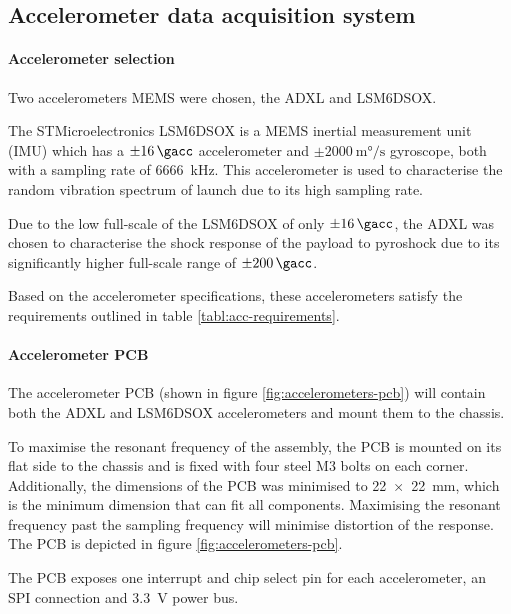 \documentclass[draft]{report}
\begin{document}
\subsection{Accelerometer data acquisition system}
\paragraph{Accelerometer selection}

Two accelerometers MEMS were chosen, the ADXL and LSM6\-DSOX.

The STMicroelectronics LSM6\-DSOX is a MEMS inertial measurement unit (IMU) which has a $\pm\SI{16}{\gacc}$ accelerometer and $\pm\SI{2000}{\milli\degree\per\second}$ gyroscope, both with a sampling rate of \SI{6666}{\kilo\hertz}. This accelerometer is used to characterise the random vibration spectrum of launch due to its high sampling rate.

Due to the low full-scale of the LSM6\-DSOX of only $\pm\SI{16}{\gacc}$, the ADXL was chosen to characterise the shock response of the payload to pyroshock due to its significantly higher full-scale range of $\pm\SI{200}{\gacc}$.

Based on the accelerometer specifications, these accelerometers satisfy the requirements outlined in table \ref{tabl:acc-requirements}.

\paragraph{Accelerometer PCB}

The accelerometer PCB (shown in figure \ref{fig:accelerometers-pcb}) will contain both the ADXL and LSM6\-DSOX accelerometers and mount them to the chassis.

To maximise the resonant frequency of the assembly, the PCB is mounted on its flat side to the chassis and is fixed with four steel M3 bolts on each corner. Additionally, the dimensions of the PCB was minimised to \SI{22x22}{\milli\metre}, which is the minimum dimension that can fit all components. Maximising the resonant frequency past the sampling frequency will minimise distortion of the response. The PCB is depicted in figure \ref{fig:accelerometers-pcb}.

The PCB exposes one interrupt and chip select pin for each accelerometer, an SPI connection and \SI{3.3}{\volt} power bus.
\end{document}

